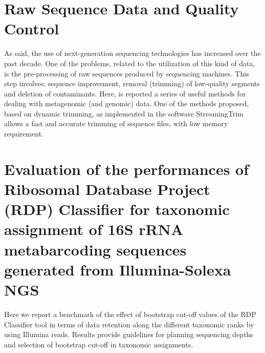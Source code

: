 \section{Raw Sequence Data and Quality Control}
As said, the use of next-generation sequencing technologies has increased over the past decade. One of the problems, related to the utilization of this kind of data, is the pre-processing of raw sequences produced by sequencing machines. This step involves: sequence improvement, removal (trimming) of low-quality segments and deletion of contaminants. Here, is reported a series of useful methods for dealing with metagenomic (and genomic) data. One of the methods proposed, based on dynamic trimming, as implemented in the software StreamingTrim allows a fast and accurate trimming of sequence files, with low memory requirement.\\
\newpage

\newpage

\section[Evaluation of the performances of Ribosomal Database Project (RDP) Classifier for taxonomic assignment of 16S rRNA metabarcoding sequences generated from Il\-lu\-mi\-na-So\-le\-xa NGS]{Evaluation of the performances of Ribosomal Database Project (RDP) Classifier for taxonomic assignment of 16S rRNA metabarcoding sequences generated from Il\-lu\-mi\-na-So\-le\-xa NGS%
}

Here we report a benchmark of the effect of bootstrap cut-off values of the RDP Classifier tool in terms of data retention along the different taxonomic ranks by using Illumina reads. Results provide guidelines for planning sequencing depths and selection of bootstrap cut-off in taxonomic assignments.\\

